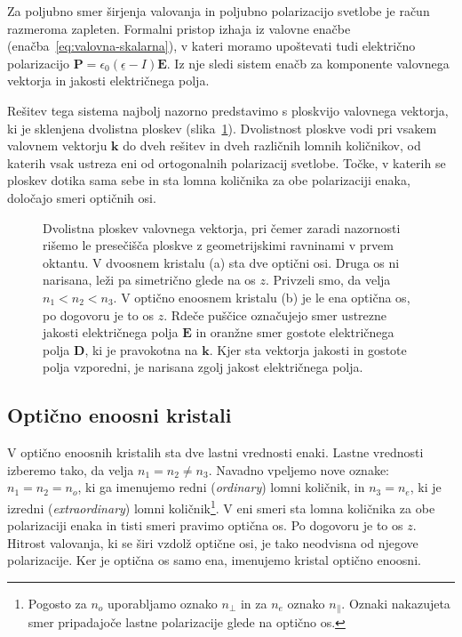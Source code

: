 Za poljubno smer širjenja valovanja in poljubno polarizacijo svetlobe je račun razmeroma zapleten. 
Formalni pristop izhaja iz valovne enačbe (enačba~\ref{eq:valovna-skalarna}), v kateri
moramo upoštevati tudi električno polarizacijo 
$\mathbf{P} = \epsilon_{0}(\underline{\epsilon}-I)\mathbf{E}$. Iz nje sledi 
sistem enačb za komponente valovnega vektorja in jakosti električnega polja. 

Rešitev tega sistema najbolj nazorno predstavimo s ploskvijo valovnega vektorja, 
ki je sklenjena dvolistna ploskev (slika~\ref{kploskev}). Dvolistnost ploskve
vodi pri vsakem valovnem vektorju $\mathbf{k}$ do dveh rešitev in dveh različnih lomnih
količnikov, od katerih vsak ustreza eni od ortogonalnih polarizacij svetlobe. Točke, v katerih
se ploskev dotika sama sebe in sta lomna količnika za obe polarizaciji enaka, 
določajo smeri optičnih osi. 
\begin{figure}[h]
\centering
\def\svgwidth{140truemm} 

\caption{Dvolistna ploskev valovnega vektorja, pri čemer zaradi nazornosti rišemo le presečišča
ploskve z geometrijskimi ravninami v prvem oktantu. 
V dvoosnem kristalu (a) sta dve optični osi. Druga os ni narisana, leži pa 
simetrično glede na os $z$. Privzeli smo, da velja $n_1<n_2<n_3$.
V optično enoosnem kristalu (b) je le ena optična os, 
po dogovoru je to os $z$. Rdeče puščice označujejo smer ustrezne jakosti električnega polja $\mathbf{E}$
in oranžne smer gostote električnega polja $\mathbf{D}$, ki je pravokotna na $\mathbf{k}$. 
Kjer sta vektorja jakosti in gostote polja vzporedni, je narisana zgolj jakost električnega polja.}
\label{kploskev}
\end{figure}

\subsection*{Optično enoosni kristali}
V optično enoosnih kristalih sta dve lastni vrednosti enaki. Lastne vrednosti izberemo
tako, da velja $n_{1}=n_{2}\neq n_{3}$. Navadno vpeljemo nove 
oznake: $n_{1}=n_{2}=n_{o}$, ki ga imenujemo redni (\textit{ordinary})
lomni količnik, in $n_{3}=n_{e}$, ki je izredni 
(\textit{extraordinary}) lomni količnik\footnote{
Pogosto za $n_o$ uporabljamo oznako $n_{\perp}$ in za $n_e$ oznako $n_{\parallel}$. Oznaki
nakazujeta smer pripadajoče lastne polarizacije glede na optično os.}. 
V eni smeri sta lomna količnika za obe polarizaciji enaka in tisti smeri pravimo 
optična os. Po dogovoru je to os $z$. Hitrost valovanja, ki
se širi vzdolž optične osi, je tako neodvisna od njegove polarizacije.
Ker je optična os samo ena, imenujemo kristal optično enoosni. 

